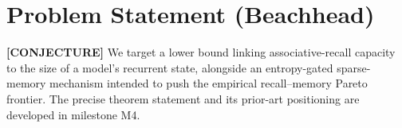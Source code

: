 \section{Problem Statement (Beachhead)}
\textbf{[CONJECTURE]} We target a lower bound linking associative-recall capacity to the size
of a model's recurrent state, alongside an entropy-gated sparse-memory mechanism intended to
push the empirical recall--memory Pareto frontier. The precise theorem statement and its
prior-art positioning are developed in milestone M4.
